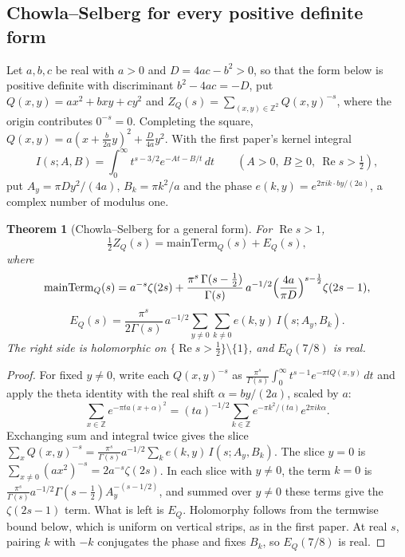 \documentclass[11pt]{article}
\newtheorem{theorem}{Theorem}[section]
\theoremstyle{definition}
\newcommand{\re}{\operatorname{Re}}
\newcommand{\Z}{\mathbb{Z}}
\begin{document}
{\subsection{Chowla--Selberg for every positive definite form}\label{sec:cs}

Let $a, b, c$ be real with $a > 0$ and $D = 4ac - b^2 > 0$, so that the form below is positive definite with discriminant $b^2 - 4ac = -D$, put $Q(x,y) = ax^2 + bxy + cy^2$ and $Z_Q(s) = \sum_{(x,y) \in \Z^2} Q(x,y)^{-s}$, where the origin contributes $0^{-s} = 0$. Completing the square, $Q(x,y) = a(x + \frac{b}{2a}y)^2 + \frac{D}{4a}y^2$. With the first paper's kernel integral
\[
I(s; A, B) = \int_0^\infty t^{s-3/2}e^{-At - B/t}\,dt \qquad (A > 0,\ B \ge 0,\ \re s > \tfrac12),
\]
put $A_y = \pi D y^2/(4a)$, $B_k = \pi k^2/a$ and the phase $e(k,y) = e^{2\pi i k \cdot by/(2a)}$, a complex number of modulus one.

\begin{theorem}[Chowla--Selberg for a general form]\label{thm:cs}
For $\re s > 1$,
\[
\tfrac12 Z_Q(s) = \mathrm{mainTerm}_Q(s) + E_Q(s),
\]
where
\[
\mathrm{mainTerm}_Q(s) = a^{-s}\zeta(2s) + \frac{\pi^s\,\Gamma(s - \frac12)}{\Gamma(s)}\,a^{-1/2}\Bigl(\frac{4a}{\pi D}\Bigr)^{s - \frac12}\zeta(2s-1),
\]
\[
E_Q(s) = \frac{\pi^s}{2\Gamma(s)}\,a^{-1/2}\sum_{y \ne 0}\sum_{k \ne 0} e(k,y)\,I(s; A_y, B_k).
\]
The right side is holomorphic on $\{\re s > \frac12\} \setminus \{1\}$, and $E_Q(7/8)$ is real.
\end{theorem}

\begin{proof}
For fixed $y \ne 0$, write each $Q(x,y)^{-s}$ as $\frac{\pi^s}{\Gamma(s)}\int_0^\infty t^{s-1}e^{-\pi t Q(x,y)}\,dt$ and apply the theta identity with the real shift $\alpha = by/(2a)$, scaled by $a$:
\[
\sum_{x \in \Z} e^{-\pi t a(x + \alpha)^2} = (ta)^{-1/2}\sum_{k \in \Z} e^{-\pi k^2/(ta)}e^{2\pi i k\alpha} .
\]
Exchanging sum and integral twice gives the slice $\sum_x Q(x,y)^{-s} = \frac{\pi^s}{\Gamma(s)}a^{-1/2}\sum_k e(k,y)\,I(s; A_y, B_k)$. The slice $y = 0$ is $\sum_{x \ne 0}(ax^2)^{-s} = 2a^{-s}\zeta(2s)$. In each slice with $y \ne 0$, the term $k = 0$ is $\frac{\pi^s}{\Gamma(s)}a^{-1/2}\Gamma(s - \frac12)A_y^{-(s - 1/2)}$, and summed over $y \ne 0$ these terms give the $\zeta(2s - 1)$ term. What is left is $E_Q$. Holomorphy follows from the termwise bound below, which is uniform on vertical strips, as in the first paper. At real $s$, pairing $k$ with $-k$ conjugates the phase and fixes $B_k$, so $E_Q(7/8)$ is real.
\end{proof}

}
\end{document}
